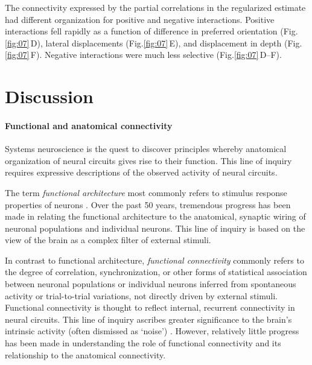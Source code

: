 \documentclass[10pt]{article}
\newcommand{\figref}[2]{Fig.\;\ref{fig:#1}\,#2}
\begin{document}
The connectivity expressed by the partial correlations in the regularized estimate had different organization for positive and negative interactions. Positive interactions fell rapidly as a function of difference in preferred orientation (\figref{07}{D}), lateral displacements (\figref{07}{E}), and displacement in depth (\figref{07}{F}). Negative interactions were much less selective (\figref{07}{D--F}).

\section*{Discussion}
\paragraph{Functional and anatomical connectivity}
Systems neuroscience is the quest to discover principles whereby anatomical organization of neural circuits gives rise to their function.  This line of inquiry requires expressive descriptions of the observed activity of neural circuits. 

The term \emph{functional architecture} most commonly refers to stimulus response properties of neurons \cite{Reid:2012}. Over the past 50 years, tremendous progress has been made in relating the functional architecture to the anatomical, synaptic wiring of neuronal populations and individual neurons.  This line of inquiry is based on the view of the brain as a complex filter of external stimuli. 

In contrast to functional architecture, \emph{functional connectivity} commonly refers to the degree of correlation, synchronization, or other forms of statistical association between neuronal populations or individual neurons inferred from spontaneous activity or trial-to-trial variations,  not directly driven by external stimuli.  Functional connectivity is thought to reflect internal, recurrent connectivity in neural circuits.  This line of inquiry ascribes greater significance to the brain's intrinsic activity (often dismissed as `noise') \cite{Yuste:2005}. However, relatively little progress has been made in understanding the role of functional connectivity and its relationship to the anatomical connectivity.
\end{document}
